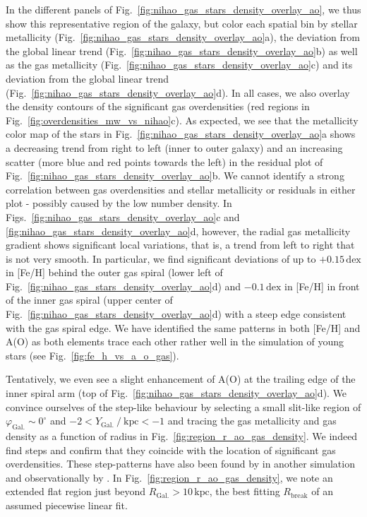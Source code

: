 \documentclass[twocolumn,apj,numberedappendix,appendixfloats,twocolappendix]{openjournal}
\begin{document}
\begin{CJK*}{UTF8}{gbsn}
In the different panels of Fig.~\ref{fig:nihao_gas_stars_density_overlay_ao}, we thus show this representative region of the galaxy, but color each spatial bin by stellar metallicity (Fig.~\ref{fig:nihao_gas_stars_density_overlay_ao}a), the deviation from the global linear trend (Fig.~\ref{fig:nihao_gas_stars_density_overlay_ao}b) as well as the gas metallicity (Fig.~\ref{fig:nihao_gas_stars_density_overlay_ao}c) and its deviation from the global linear trend (Fig.~\ref{fig:nihao_gas_stars_density_overlay_ao}d). In all cases, we also overlay the density contours of the significant gas overdensities (red regions in Fig.~\ref{fig:overdensities_mw_vs_nihao}c). As expected, we see that the metallicity color map of the stars in Fig.~\ref{fig:nihao_gas_stars_density_overlay_ao}a shows a decreasing trend from right to left (inner to outer galaxy) and an increasing scatter (more blue and red points towards the left) in the residual plot of Fig.~\ref{fig:nihao_gas_stars_density_overlay_ao}b. We cannot identify a strong correlation between gas overdensities and stellar metallicity or residuals in either plot - possibly caused by the low number density. In Figs.~\ref{fig:nihao_gas_stars_density_overlay_ao}c and \ref{fig:nihao_gas_stars_density_overlay_ao}d, however, the radial gas metallicity gradient shows significant local variations, that is, a trend from left to right that is not very smooth. In particular, we find significant deviations of up to $+0.15\,\mathrm{dex}$ in [Fe/H] behind the outer gas spiral (lower left of Fig.~\ref{fig:nihao_gas_stars_density_overlay_ao}d) and $-0.1\,\mathrm{dex}$ in [Fe/H] in front of the inner gas spiral (upper center of Fig.~\ref{fig:nihao_gas_stars_density_overlay_ao}d) with a steep edge consistent with the gas spiral edge. We have identified the same patterns in both [Fe/H] and A(O) as both elements trace each other rather well in the simulation of young stars (see Fig.~\ref{fig:fe_h_vs_a_o_gas}).

Tentatively, we even see a slight enhancement of A(O) at the trailing edge of the inner spiral arm (top of Fig.~\ref{fig:nihao_gas_stars_density_overlay_ao}d). We convince ourselves of the step-like behaviour by selecting a small slit-like region of $\varphi_\mathrm{Gal.} \sim 0^\circ$ and $-2 < Y_\mathrm{Gal.}~/~\mathrm{kpc} < -1$ and tracing the gas metallicity and gas density as a function of radius in Fig.~\ref{fig:region_r_ao_gas_density}. We indeed find steps and confirm that they coincide with the location of significant gas overdensities. These step-patterns have also been found by \citet{Grand2015} in another simulation and observationally by \citet{Ho2017c}. In Fig.~\ref{fig:region_r_ao_gas_density}, we note an extended flat region just beyond $R_\mathrm{Gal.} > 10\,\mathrm{kpc}$, the best fitting $R_\mathrm{break}$ of an assumed piecewise linear fit.


\end{CJK*}
\end{document}
